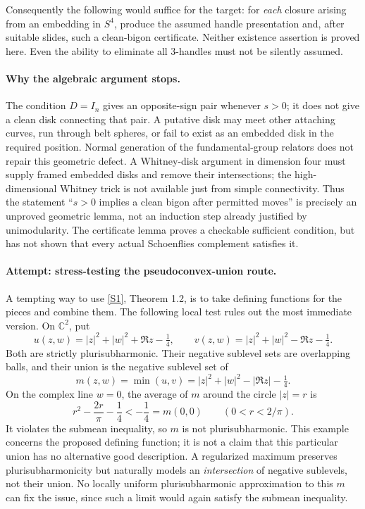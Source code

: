 \documentclass[11pt,a4paper]{article}
\newcommand{\C}{\mathbb{C}}
\newcommand{\sref}[2]{\hyperlink{source:#1:#2}{[S#2]}}
\numberwithin{equation}{section}
\begin{document}
Consequently the following would suffice for the target: for \emph{each}
closure arising from an embedding in $S^4$, produce the assumed
handle presentation and, after suitable slides, such a clean-bigon
certificate. Neither existence assertion is proved here. Even the
ability to eliminate all 3-handles must not be silently assumed.

\paragraph{Why the algebraic argument stops.}
The condition $D=I_n$ gives an opposite-sign pair whenever $s>0$; it
does not give a clean disk connecting that pair. A putative disk may
meet other attaching curves, run through belt spheres, or fail to exist
as an embedded disk in the required position. Normal generation of the
fundamental-group relators does not repair this geometric defect. A
Whitney-disk argument in dimension four must supply framed embedded
disks and remove their intersections; the high-dimensional Whitney
trick is not available just from simple connectivity. Thus the statement
``$s>0$ implies a clean bigon after permitted moves'' is precisely an
unproved geometric lemma, not an induction step already justified by
unimodularity. The certificate lemma proves a checkable sufficient
condition, but has not shown that every actual Schoenflies complement
satisfies it.

\paragraph{Attempt: stress-testing the pseudoconvex-union route.}
A tempting way to use \sref{165}{1}, Theorem 1.2, is to take defining
functions for the pieces and combine them. The following local test
rules out the most immediate version. On $\C^2$, put
\begin{equation}
 u(z,w)=|z|^2+|w|^2+\Re z-\tfrac14,\qquad
 v(z,w)=|z|^2+|w|^2-\Re z-\tfrac14.
\end{equation}
Both are strictly plurisubharmonic. Their negative sublevel sets are
overlapping balls, and their union is the negative sublevel set of
\begin{equation}
 m(z,w)=\min(u,v)=|z|^2+|w|^2-|\Re z|-\tfrac14.
\end{equation}
On the complex line $w=0$, the average of $m$ around the circle
$|z|=r$ is
\begin{equation}
 r^2-\frac{2r}{\pi}-\frac14<-\frac14=m(0,0)
 \qquad(0<r<2/\pi).
\end{equation}
It violates the submean inequality, so $m$ is not plurisubharmonic.
This example concerns the proposed defining function; it is not a
claim that this particular union has no alternative good description.
A regularized maximum preserves plurisubharmonicity but naturally
models an \emph{intersection} of negative sublevels, not their union.
No locally uniform plurisubharmonic approximation to this $m$ can fix
the issue, since such a limit would again satisfy the submean inequality.
\end{document}
